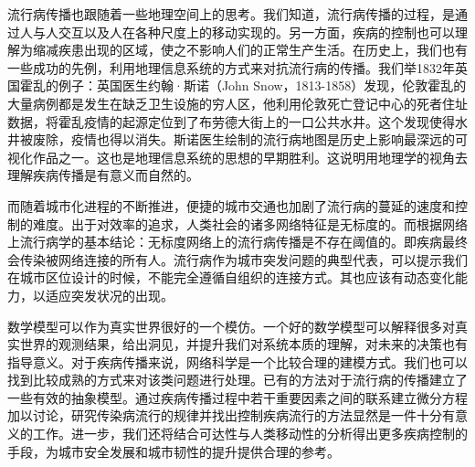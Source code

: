 流行病传播也跟随着一些地理空间上的思考。我们知道，流行病传播的过程，是通过人与人交互以及人在各种尺度上的移动实现的\cite{belik2011natural}。另一方面，疾病的控制也可以理解为缩减疾患出现的区域，使之不影响人们的正常生产生活。在历史上，我们也有一些成功的先例，利用地理信息系统的方式来对抗流行病的传播。我们举1832年英国霍乱的例子：英国医生约翰·斯诺（John Snow，1813-1858）发现，伦敦霍乱的大量病例都是发生在缺乏卫生设施的穷人区，他利用伦敦死亡登记中心的死者住址数据，将霍乱疫情的起源定位到了布劳德大街上的一口公共水井。这个发现使得水井被废除，疫情也得以消失。斯诺医生绘制的流行病地图是历史上影响最深远的可视化作品之一。这也是地理信息系统的思想的早期胜利。这说明用地理学的视角去理解疾病传播是有意义而自然的。

而随着城市化进程的不断推进，便捷的城市交通也加剧了流行病的蔓延的速度和控制的难度。出于对效率的追求，人类社会的诸多网络特征是无标度的。而根据网络上流行病学的基本结论：无标度网络上的流行病传播是不存在阈值的。即疾病最终会传染被网络连接的所有人\cite{PhysRevLett.89.108701,PhysRevE.65.035108}。流行病作为城市突发问题的典型代表，可以提示我们在城市区位设计的时候，不能完全遵循自组织的连接方式。其也应该有动态变化能力，以适应突发状况的出现。

数学模型可以作为真实世界很好的一个模仿。一个好的数学模型可以解释很多对真实世界的观测结果，给出洞见，并提升我们对系统本质的理解，对未来的决策也有指导意义。对于疾病传播来说，网络科学是一个比较合理的建模方式。我们也可以找到比较成熟的方式来对该类问题进行处理\cite{kiss2017mathematics}。已有的方法对于流行病的传播建立了一些有效的抽象模型。通过疾病传播过程中若干重要因素之间的联系建立微分方程加以讨论，研究传染病流行的规律并找出控制疾病流行的方法显然是一件十分有意义的工作。进一步，我们还将结合可达性与人类移动性的分析得出更多疾病控制的手段，为城市安全发展和城市韧性的提升提供合理的参考。